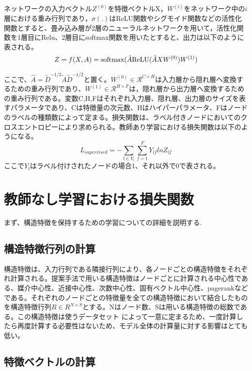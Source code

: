 ネットワークの入力ベクトル$Z^{(0)}$を特徴ベクトルX，$W^{(i)}$をネットワーク中の$i$層における重み行列であり，$\sigma(.)$はReLU関数やシグモイド関数などの活性化関数とすると、畳み込み層が2層のニューラルネットワークを用いて，活性化関数を1層目にRelu、2層目にsoftmax関数を用いたとすると、出力は以下のように表される。
\begin{equation}
Z = f(X, A) = {\rm softmax}(\hat{A}{\rm ReLU}(\hat{A} XW^{(0)})W^{(1)})
\end{equation}





ここで、$ \hat{A} = \tilde{D}^{-1/2} \tilde{A} \tilde{D}^{-1/2} $と置く。$W^{(0)} \in \mathcal{R}^{C\times H}$は入力層から隠れ層へ変換するための重み行列であり、$W^{(1)} \in \mathcal{R}^{H\times F}$は，隠れ層から出力層へ変換するための重み行列である。変数C,H,Fはそれぞれ入力層、隠れ層、出力層のサイズを表すパラメータであり、Cは特徴量の次元数、Hはハイパーパラメータ、Fはノードのラベルの種類数によって定まる。損失関数は、ラベル付きノードにおいてのクロスエントロピーにより求められる。教師あり学習における損失関数は以下のようになる。
\begin{equation}
L_{supervised} = - \sum_{l \in Y_{l}} \sum_{f=1}^{F} Y_{lf} lnZ_{lf}
\end{equation}
ここで$Y_{l}$はラベル付けされたノードの場合1、それ以外で0で表される。


\section{教師なし学習における損失関数}
まず、構造特徴を保持するための学習についての詳細を説明する.

\subsection{構造特徴行列の計算}
構造特徴は、入力行列である隣接行列により、各ノードごとの構造特徴をそれぞれ計算される。提案手法で用いる構造特徴はノードごとに計算される中心性である、媒介中心性、近接中心性、次数中心性、固有ベクトル中心性、pagerankなどである。それぞれのノードごとの特徴量を全ての構造特徴において結合したものを構造特徴行列$ R\in R^{N\times S}$とする。Nはノード数、Sは用いる構造特徴の総数である。この構造特徴は使うデータセット によって一意に定まるため、一度計算したら再度計算する必要性はないため、モデル全体の計算量に対する影響はとても低い。

\subsection{特徴ベクトルの計算}

